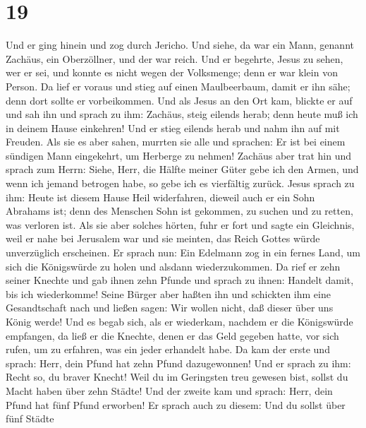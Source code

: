 \hypertarget{section-18}{%
\section{19}\label{section-18}}

 Und er ging hinein und zog durch Jericho. 
Und siehe, da war ein Mann, genannt Zachäus, ein Oberzöllner, und der
war reich.  Und er begehrte, Jesus zu sehen, wer er sei,
und konnte es nicht wegen der Volksmenge; denn er war klein von Person.
 Da lief er voraus und stieg auf einen Maulbeerbaum, damit
er ihn sähe; denn dort sollte er vorbeikommen.  Und als
Jesus an den Ort kam, blickte er auf und sah ihn und sprach zu ihm:
Zachäus, steig eilends herab; denn heute muß ich in deinem Hause
einkehren!  Und er stieg eilends herab und nahm ihn auf
mit Freuden.  Als sie es aber sahen, murrten sie alle und
sprachen: Er ist bei einem sündigen Mann eingekehrt, um Herberge zu
nehmen!  Zachäus aber trat hin und sprach zum Herrn:
Siehe, Herr, die Hälfte meiner Güter gebe ich den Armen, und wenn ich
jemand betrogen habe, so gebe ich es vierfältig zurück. 
Jesus sprach zu ihm: Heute ist diesem Hause Heil widerfahren, dieweil
auch er ein Sohn Abrahams ist;  denn des Menschen Sohn
ist gekommen, zu suchen und zu retten, was verloren ist. 
Als sie aber solches hörten, fuhr er fort und sagte ein Gleichnis, weil
er nahe bei Jerusalem war und sie meinten, das Reich Gottes würde
unverzüglich erscheinen.  Er sprach nun: Ein Edelmann zog
in ein fernes Land, um sich die Königswürde zu holen und alsdann
wiederzukommen.  Da rief er zehn seiner Knechte und gab
ihnen zehn Pfunde und sprach zu ihnen: Handelt damit, bis ich
wiederkomme!  Seine Bürger aber haßten ihn und schickten
ihm eine Gesandtschaft nach und ließen sagen: Wir wollen nicht, daß
dieser über uns König werde!  Und es begab sich, als er
wiederkam, nachdem er die Königswürde empfangen, da ließ er die Knechte,
denen er das Geld gegeben hatte, vor sich rufen, um zu erfahren, was ein
jeder erhandelt habe.  Da kam der erste und sprach: Herr,
dein Pfund hat zehn Pfund dazugewonnen!  Und er sprach zu
ihm: Recht so, du braver Knecht! Weil du im Geringsten treu gewesen
bist, sollst du Macht haben über zehn Städte!  Und der
zweite kam und sprach: Herr, dein Pfund hat fünf Pfund erworben!
 Er sprach auch zu diesem: Und du sollst über fünf Städte
